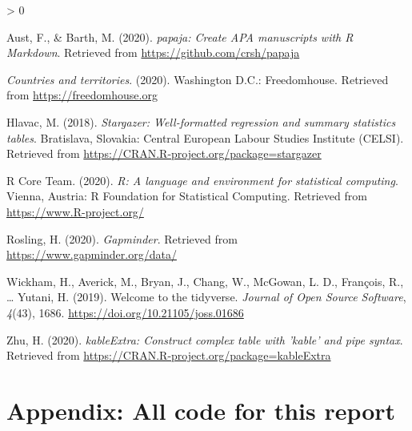 \documentclass[
  english,
  man,floatsintext]{apa6}
\newlength{\cslhangindent}
\newenvironment{CSLReferences}[2] %
 {%
  \setlength{\parindent}{0pt}
  \ifodd #1 \everypar{\setlength{\hangindent}{\cslhangindent}}\ignorespaces\fi
  \ifnum #2 > 0
  \setlength{\parskip}{#2\baselineskip}
  \fi
 }%
 {}
\begin{document}
\hypertarget{refs}{}
\begin{CSLReferences}{1}{0}
\leavevmode\hypertarget{ref-R-papaja}{}%
Aust, F., \& Barth, M. (2020). \emph{{papaja}: {Create} {APA} manuscripts with {R Markdown}}. Retrieved from \url{https://github.com/crsh/papaja}

\leavevmode\hypertarget{ref-Freedomhouse}{}%
\emph{Countries and territories}. (2020). Washington D.C.: Freedomhouse. Retrieved from \url{https://freedomhouse.org}

\leavevmode\hypertarget{ref-R-stargazer}{}%
Hlavac, M. (2018). \emph{Stargazer: Well-formatted regression and summary statistics tables}. Bratislava, Slovakia: Central European Labour Studies Institute (CELSI). Retrieved from \url{https://CRAN.R-project.org/package=stargazer}

\leavevmode\hypertarget{ref-R-base}{}%
R Core Team. (2020). \emph{R: A language and environment for statistical computing}. Vienna, Austria: R Foundation for Statistical Computing. Retrieved from \url{https://www.R-project.org/}

\leavevmode\hypertarget{ref-Gapminder}{}%
Rosling, H. (2020). \emph{Gapminder}. Retrieved from \url{https://www.gapminder.org/data/}

\leavevmode\hypertarget{ref-R-tidyverse}{}%
Wickham, H., Averick, M., Bryan, J., Chang, W., McGowan, L. D., François, R., \ldots{} Yutani, H. (2019). Welcome to the {tidyverse}. \emph{Journal of Open Source Software}, \emph{4}(43), 1686. \url{https://doi.org/10.21105/joss.01686}

\leavevmode\hypertarget{ref-R-kableExtra}{}%
Zhu, H. (2020). \emph{kableExtra: Construct complex table with 'kable' and pipe syntax}. Retrieved from \url{https://CRAN.R-project.org/package=kableExtra}

\end{CSLReferences}

\endgroup

\newpage

\hypertarget{appendix-all-code-for-this-report}{%
\section{Appendix: All code for this report}\label{appendix-all-code-for-this-report}}
\end{document}
